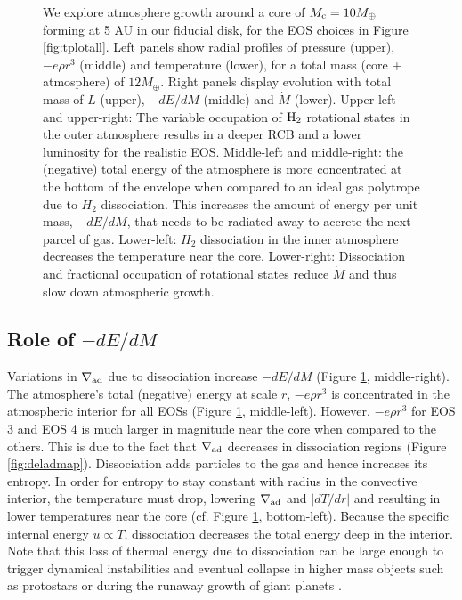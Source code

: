 \begin{figure}[H]
{We explore atmosphere growth around a core of $M_{\rm c}=10 M_{\oplus}$ forming at 5 AU in our fiducial disk, for the EOS choices in Figure \ref{fig:tplotall}. Left panels show radial profiles of pressure (upper), $-e \rho r^3$ (middle) and temperature (lower), for a total mass (core + atmosphere) of $12 M_{\oplus}$. Right panels display evolution with total mass of $L$ (upper), $-dE/dM$ (middle) and $\dot{M}$ (lower). Upper-left and upper-right: The variable occupation of $\rm H_2$ rotational states in the outer atmosphere results in a deeper RCB and a lower luminosity for the realistic EOS. Middle-left and middle-right: the (negative) total energy of the atmosphere is more concentrated at the bottom of the envelope when compared to an ideal gas polytrope due to $H_2$ dissociation. This increases the amount of energy per unit mass, $-dE/dM$, that needs to be radiated away to accrete the next parcel of gas. Lower-left: $H_2$ dissociation in the inner atmosphere decreases the temperature near the core. Lower-right: Dissociation and fractional occupation of rotational states reduce $\dot{M}$ and thus slow down atmospheric growth.}
\label{fig:all_plot}
\end{figure}

\subsection{Role of $-dE/dM$}\label{sec:dEdM}

Variations in $\nabla_{\rm ad}$ due to dissociation increase $-dE/dM$ (Figure \ref{fig:all_plot}, middle-right). 
The atmosphere's total (negative) energy at scale $r$, $-e \rho r^3$ 
is concentrated in the atmospheric interior for all EOSs (Figure \ref{fig:all_plot}, middle-left). However, $-e \rho r^3$ for EOS 3 and EOS 4 is much larger in magnitude near the core when compared to the others. This is due to the fact that $\nabla_{\rm ad}$ decreases in dissociation regions (Figure \ref{fig:deladmap}). Dissociation adds particles to the gas and hence increases its entropy. In order for entropy to stay constant with radius in the convective interior, the temperature must drop, lowering $\nabla_{\rm ad}$ and $|dT/dr|$ and resulting in lower temperatures near the core (cf. Figure \ref{fig:all_plot}, bottom-left). Because  the specific internal energy $u \propto T$, dissociation decreases the total energy deep in the interior.  Note that this loss of thermal energy due to dissociation can be large enough to trigger dynamical instabilities and eventual collapse in higher mass objects such as protostars \citep{larson69} or during the runaway growth of giant planets \citep{bodenheimer80}.  



